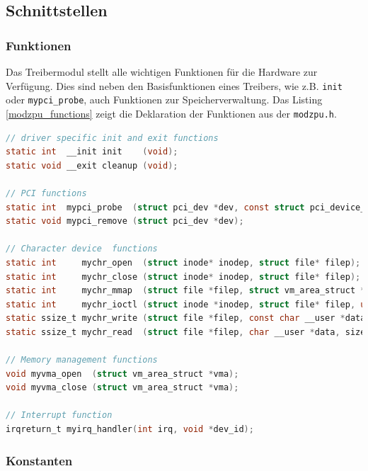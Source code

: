 \documentclass[11pt]{scrartcl}
\begin{document}
\subsection{Schnittstellen}

\subsubsection{Funktionen}

Das Treibermodul stellt alle wichtigen Funktionen für die Hardware zur Verfügung. Dies sind neben den Basisfunktionen eines Treibers, wie z.B. \texttt{init} oder \texttt{mypci\_probe}, auch Funktionen zur Speicherverwaltung. Das Listing \ref{modzpu_functions} zeigt die Deklaration der Funktionen aus der \texttt{modzpu.h}.

\begin{lstlisting}[language=C,firstnumber=47, label=modzpu_functions,caption=Funktionsüberblick des Treibermoduls]
// driver specific init and exit functions
static int  __init init    (void);
static void __exit cleanup (void);

// PCI functions
static int  mypci_probe  (struct pci_dev *dev, const struct pci_device_id *id);
static void mypci_remove (struct pci_dev *dev);

// Character device  functions
static int     mychr_open  (struct inode* inodep, struct file* filep);
static int     mychr_close (struct inode* inodep, struct file* filep);
static int     mychr_mmap  (struct file *filep, struct vm_area_struct *vma);
static int     mychr_ioctl (struct inode *inodep, struct file* filep, unsigned int cmd, unsigned long param);
static ssize_t mychr_write (struct file *filep, const char __user *data, size_t count, loff_t *offset);
static ssize_t mychr_read  (struct file *filep, char __user *data, size_t count, loff_t *offset);

// Memory management functions
void myvma_open  (struct vm_area_struct *vma);
void myvma_close (struct vm_area_struct *vma);

// Interrupt function
irqreturn_t myirq_handler(int irq, void *dev_id);
\end{lstlisting}

\subsubsection{Konstanten}
\end{document}
